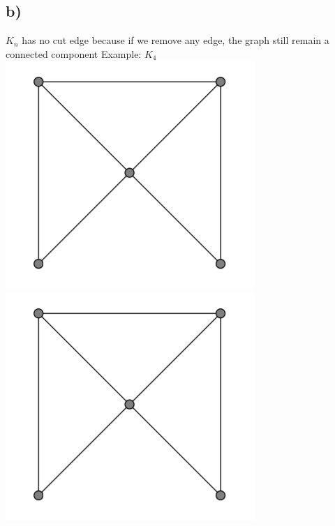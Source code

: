 \documentclass{article}
\begin{document}
\subsection*{b)}
$K_n$ has no cut edge because if we remove any edge, the graph still remain a connected component
Example: $K_4$
\newline
\includegraphics[]{Question 9/connectivity_9.b.edited.png}
\includegraphics[]{Question 9/connectivity_9.b.edited.png}
\newline
\end{document}
